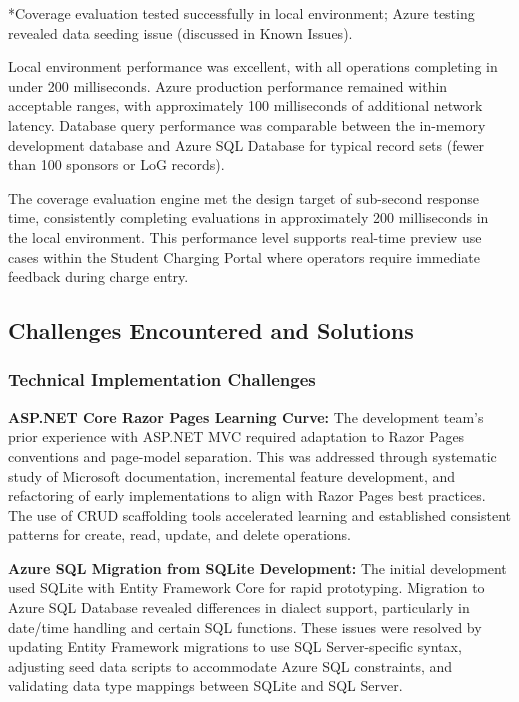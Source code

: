 *Coverage evaluation tested successfully in local environment; Azure testing revealed data seeding issue (discussed in Known Issues).

Local environment performance was excellent, with all operations completing in under 200 milliseconds. Azure production performance remained within acceptable ranges, with approximately 100 milliseconds of additional network latency. Database query performance was comparable between the in-memory development database and Azure SQL Database for typical record sets (fewer than 100 sponsors or LoG records).

The coverage evaluation engine met the design target of sub-second response time, consistently completing evaluations in approximately 200 milliseconds in the local environment. This performance level supports real-time preview use cases within the Student Charging Portal where operators require immediate feedback during charge entry.

\subsection{Challenges Encountered and Solutions}

\subsubsection{Technical Implementation Challenges}

\textbf{ASP.NET Core Razor Pages Learning Curve:} The development team's prior experience with ASP.NET MVC required adaptation to Razor Pages conventions and page-model separation. This was addressed through systematic study of Microsoft documentation, incremental feature development, and refactoring of early implementations to align with Razor Pages best practices. The use of CRUD scaffolding tools accelerated learning and established consistent patterns for create, read, update, and delete operations.

\textbf{Azure SQL Migration from SQLite Development:} The initial development used SQLite with Entity Framework Core for rapid prototyping. Migration to Azure SQL Database revealed differences in dialect support, particularly in date/time handling and certain SQL functions. These issues were resolved by updating Entity Framework migrations to use SQL Server-specific syntax, adjusting seed data scripts to accommodate Azure SQL constraints, and validating data type mappings between SQLite and SQL Server.


